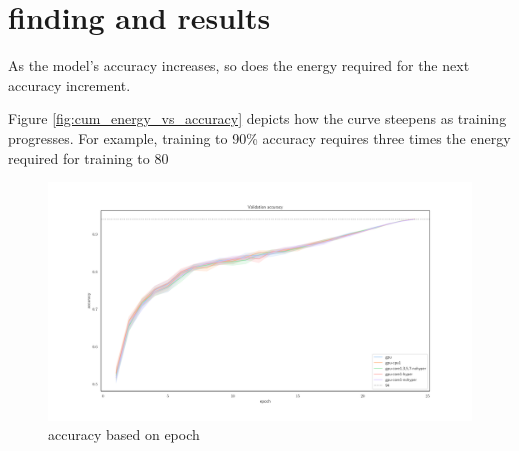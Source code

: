 \section{finding and results}
As the model's accuracy increases, so does the energy required for the next accuracy increment.

Figure \ref{fig:cum_energy_vs_accuracy} depicts how the curve steepens as training progresses.
For example, training to 90\% accuracy requires three times the energy required for training to 80%
\begin{figure}
    \centering
    \includegraphics[width=\linewidth]{imgs/accuracy_basedonepoch}
    \caption{accuracy based on epoch  }
    \label{fig:p2}
\end{figure}

